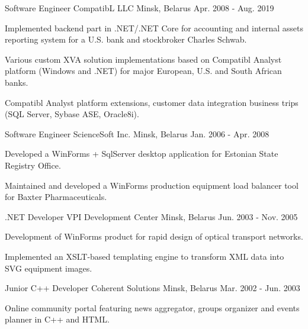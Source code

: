 \begin{cventries}
  \cventry
    {Software Engineer} %
    {CompatibL LLC} %
    {Minsk, Belarus} %
    {Apr. 2008 - Aug. 2019} %
    {
      \begin{cvitems} %
        \item {Implemented backend part in .NET/.NET Core for accounting and internal assets reporting system for a U.S. bank and stockbroker Charles Schwab.}
        \item {Various custom XVA solution implementations based on Compatibl Analyst platform (Windows and .NET) for major European, U.S. and South African banks.}
        \item {Compatibl Analyst platform extensions, customer data integration business trips (SQL Server, Sybase ASE, Oracle8i).}  
      \end{cvitems}
    }

  \cventry
    {Software Engineer} %
    {ScienceSoft Inc.} %
    {Minsk, Belarus} %
    {Jan. 2006 - Apr. 2008} %
    {
      \begin{cvitems} %
        \item {Developed a WinForms + SqlServer desktop application for Estonian State Registry Office.}
        \item {Maintained and developed a WinForms production equipment load balancer tool for Baxter Pharmaceuticals.}
      \end{cvitems}
    }

  \cventry
    {.NET Developer} %
    {VPI Development Center} %
    {Minsk, Belarus} %
    {Jun. 2003 - Nov. 2005} %
    {
      \begin{cvitems} %
        \item {Development of WinForms product for rapid design of optical transport networks.}
        \item {Implemented an XSLT-based templating engine to transform XML data into SVG equipment images.}
      \end{cvitems}
    }

  \cventry
    {Junior C++ Developer} %
    {Coherent Solutions} %
    {Minsk, Belarus} %
    {Mar. 2002 - Jun. 2003} %
    {
      \begin{cvitems} %
        \item {Online community portal featuring news aggregator, groups organizer and events planner in C++ and HTML.}
      \end{cvitems}
    }

\end{cventries}
